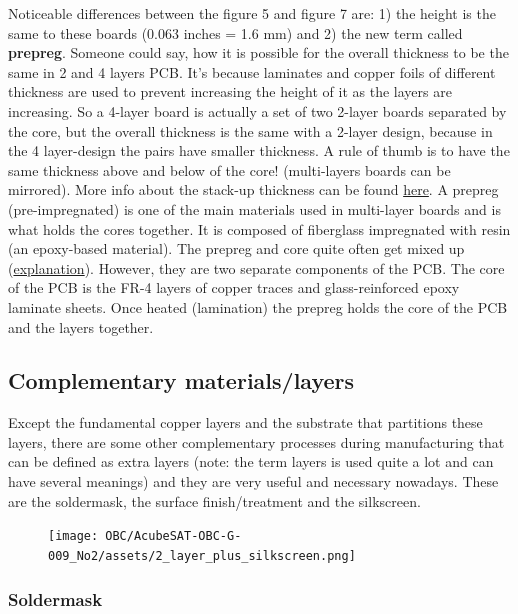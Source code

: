 \documentclass[final]{cubedoc}
\begin{document}
	Noticeable differences between the figure 5 and figure 7 are: 1) the height is the same to these boards (0.063 inches = 1.6 mm) and 2) the new term called \textbf{prepreg}. Someone could say, how it is possible for the overall thickness to be the same in 2 and 4 layers PCB. It’s because laminates and copper foils of different thickness are used to prevent increasing the height of it as the layers are increasing. So a 4-layer board is actually a set of two 2-layer boards separated by  the core, but the overall thickness is the same with a 2-layer design, because in the 4 layer-design the pairs have smaller thickness. A rule of thumb is to have the same thickness above and below of the core! (multi-layers boards can be mirrored). More info about the stack-up thickness can be found \href{https://www.cbspcb.com/pcboard-stackups/}{here}. A prepreg (pre-impregnated) is one of the main materials used in multi-layer boards and is what holds the cores together. It is composed of fiberglass impregnated with resin (an epoxy-based material). The prepreg and core quite often get mixed up (\href{https://electronics.stackexchange.com/questions/356063/what-exactly-is-prepreg-and-core-in-a-pcb}{explanation}). However, they are two separate components of the PCB. The core of the PCB is the FR-4 layers of copper traces and glass-reinforced epoxy laminate sheets. Once heated (lamination) the prepreg holds the core of the PCB and the layers together.
	
	\subsection{Complementary materials/layers}
	\label{subsec:complementary}
	
	Except the fundamental copper layers and the substrate that partitions these layers, there are some other complementary processes during manufacturing that can be defined as extra layers (note: the term layers is used quite a lot and can have several meanings) and they are very useful and necessary nowadays. These are the soldermask, the surface finish/treatment and the silkscreen.
	
	\pagebreak
	
	\begin{figure}[h!]
		\centering
		\texttt{[image: OBC/AcubeSAT-OBC-G-009\_No2/assets/2\_layer\_plus\_silkscreen.png]}
		\caption{}
		\label{fig:my_label}
	\end{figure}
	
	\subsubsection{Soldermask}
	
\end{document}
